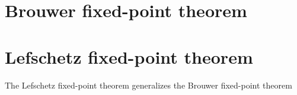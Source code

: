 

\section{Brouwer fixed-point theorem}

\section{Lefschetz fixed-point theorem}

The Lefschetz fixed-point theorem generalizes the Brouwer fixed-point theorem